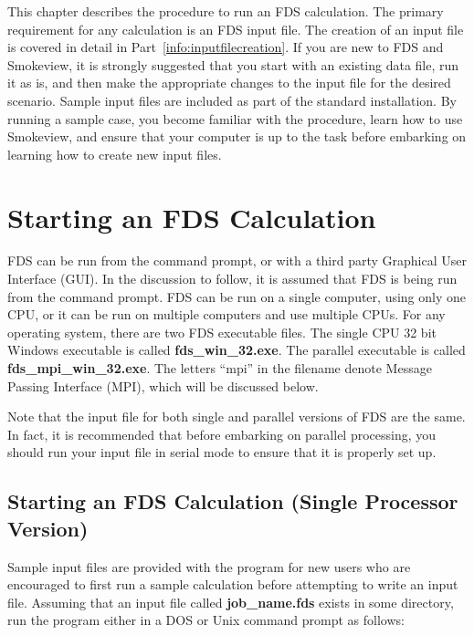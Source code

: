 \documentclass[11pt]{book}
\begin{document}
This chapter describes the procedure to run an FDS calculation.
The primary requirement for any calculation is an FDS input file. The creation of an
input file is covered in detail in Part~\ref{info:inputfilecreation}.
If you are new to FDS and Smokeview, it is strongly suggested that you start with an existing data file, run it as is,
and then make the appropriate changes to the input file for the
desired scenario. Sample input files are included as part of the standard installation.
By running a sample case, you become familiar with the procedure, learn how to use Smokeview, and
ensure that your computer is up to the task before embarking on
learning how to create new input files.



\section{Starting an FDS Calculation}

FDS can be run from the command prompt, or with a third party Graphical User Interface (GUI).
In the discussion to follow, it is assumed that FDS is being run from the command prompt.
FDS can be run on a single computer, using only one CPU, or it can be run on multiple
computers and use multiple CPUs. For any operating system, there are two FDS executable files.
The single CPU 32 bit Windows executable is called {\bf fds\_win\_32.exe}.
The parallel executable is called {\bf fds\_mpi\_win\_32.exe}. The letters ``mpi'' in the filename denote
Message Passing Interface (MPI), which will be discussed below.

\begin{warning}
\noindent
Note that the input file for both single and parallel versions of FDS are the same.
In fact, it is recommended that before embarking on parallel processing, you should run your input
file in serial mode to ensure that it is properly set up.
\end{warning}


\subsection{Starting an FDS Calculation (Single Processor Version)}

Sample input files are provided with the program for new users who
are encouraged to first run a sample calculation before attempting to
write an input file. Assuming that an input file called {\bf job\_name.fds}
exists in some directory, run the program either in a DOS or Unix command prompt as follows:
\end{document}
